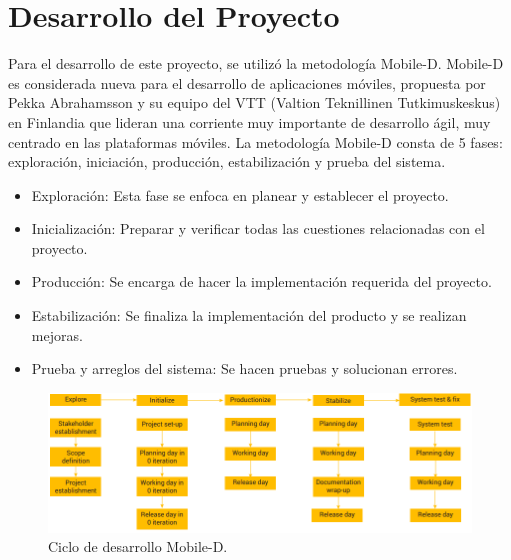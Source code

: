 \documentclass[12pt,letterpaper,openany]{book}
\begin{document}

\chapter{Desarrollo del Proyecto}\label{cap.desarrollo_del_proyecto}
Para el desarrollo de este proyecto, se utilizó la metodología Mobile-D.
Mobile-D es considerada nueva para el desarrollo de aplicaciones móviles, propuesta por Pekka Abrahamsson y su equipo del VTT (Valtion Teknillinen Tutkimuskeskus) en Finlandia que lideran una corriente muy importante de desarrollo ágil, muy centrado en las plataformas móviles.
La metodología Mobile-D consta de 5 fases: exploración, iniciación, producción, estabilización y prueba del sistema. 
\begin{itemize}
    \item Exploración: Esta fase se enfoca en planear y establecer el proyecto. 
    \item Inicialización: Preparar y verificar todas las cuestiones relacionadas con el proyecto. 
    \item Producción: Se encarga de hacer la implementación requerida del proyecto. 
    \item Estabilización: Se finaliza la implementación del producto y se realizan mejoras. 
    \item Prueba y arreglos del sistema: Se hacen pruebas y solucionan errores.
\end{itemize}

\begin{figure}[H]
\begin{center}
\includegraphics[width=16cm]{./imagenes/ciclo_desarrollo}
\caption{Ciclo de desarrollo Mobile-D. \cite{26}}
\end{center}
\end{figure}
\end{document}
